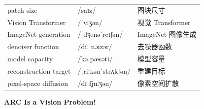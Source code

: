 \documentclass[UTF8,12pt,a4paper]{ctexart}
\providecommand{\zh}[1]{#1}
\begin{document}
\begin{tabular*}{\textwidth}{@{\extracolsep{\fill}}lll@{}}
patch size & {\ipafont /saɪz/} & \zh{图块尺寸} \\
Vision Transformer & {\ipafont /ˈvɪʒən/} & \zh{视觉 Transformer} \\
ImageNet generation & {\ipafont /ˌdʒenəˈreɪʃən/} & \zh{ImageNet 图像生成} \\
denoiser function & {\ipafont /diːˈnɔɪzər/} & \zh{去噪器函数} \\
model capacity & {\ipafont /kəˈpæsəti/} & \zh{模型容量} \\
reconstruction target & {\ipafont /ˌriːkənˈstrʌkʃən/} & \zh{重建目标} \\
pixel-space diffusion & {\ipafont /dɪˈfjuːʒən/} & \zh{像素空间扩散} \\
\bottomrule
\end{tabular*}

\newpage

\begin{center}
    {\Large\bfseries ARC Is a Vision Problem!}
\end{center}
\end{document}
